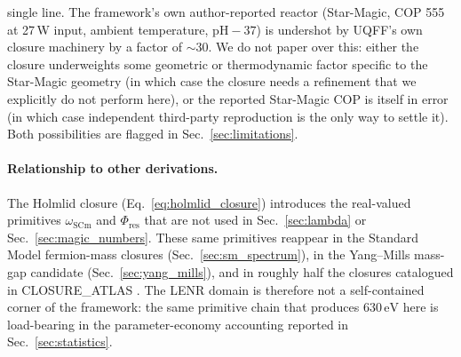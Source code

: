 \begin{enumerate}
{        single line.} The framework's own author-reported reactor
        (Star-Magic, COP 555 at 27\,W input, ambient temperature,
        $\mathrm{pH}-37$) is undershot by UQFF's own closure
        machinery by a factor of $\sim 30$. We do not paper over this:
        either the closure underweights some geometric or
        thermodynamic factor specific to the Star-Magic geometry
        (in which case the closure needs a refinement that we
        explicitly do not perform here), or the reported Star-Magic
        COP is itself in error (in which case independent third-party
        reproduction is the only way to settle it). Both possibilities
        are flagged in Sec.~\ref{sec:limitations}.
\end{enumerate}

\paragraph{Relationship to other derivations.}
The Holmlid closure (Eq.~\ref{eq:holmlid_closure}) introduces the
real-valued primitives $\omega_{\text{SCm}}$ and $\Phi_{\text{res}}$
that are not used in Sec.~\ref{sec:lambda} or Sec.~\ref{sec:magic_numbers}.
These same primitives reappear in the Standard Model fermion-mass
closures (Sec.~\ref{sec:sm_spectrum}), in the Yang--Mills mass-gap
candidate (Sec.~\ref{sec:yang_mills}), and in roughly half the closures
catalogued in CLOSURE\_ATLAS \cite{Murphy_StarMagic_Software}. The
LENR domain is therefore not a self-contained corner of the framework:
the same primitive chain that produces $630\,\mathrm{eV}$ here is
load-bearing in the parameter-economy accounting reported in
Sec.~\ref{sec:statistics}.

